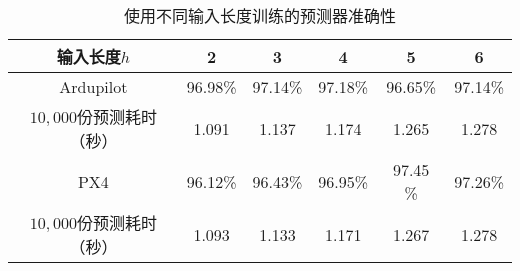 \begin{table}[ht]
\caption{使用不同输入长度训练的预测器准确性}
\label{tab:fix_predictor}
\centering
\begin{threeparttable}
\begin{tabular}{c|ccccc}
        \toprule[1.5pt]
        输入长度$h$  & {2} & {3} & {4} & {5} & {6} \\
        \midrule[0.8pt]
        
        Ardupilot & 96.98\%  & 97.14\% & 97.18\% & 96.65\% & 97.14\%  \\
        
        $10,000$份预测耗时（秒） & 1.091 & 1.137  & 1.174  & 1.265  & 1.278  \\

        \midrule[0.8pt]
        
        PX4 & 96.12\% & 96.43\% & 96.95\% & 97.45 \% & 97.26\% \\
        
        $10,000$份预测耗时（秒） & 1.093 & 1.133  & 1.171  & 1.267  & 1.278 \\
    
        
        
        \bottomrule[1.5pt]
\end{tabular}
\end{threeparttable}
\end{table}